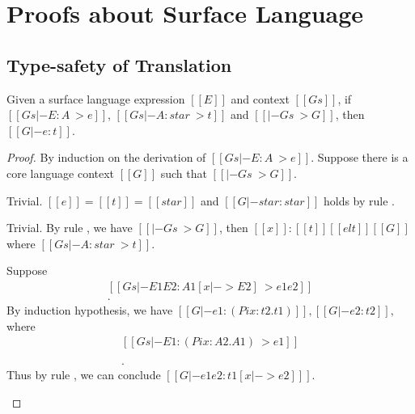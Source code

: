 \section{Proofs about Surface Language}
\subsection{Type-safety of Translation}

\begin{thm}
Given a surface language expression $[[E]]$ and context $[[Gs]]$, 
if $[[Gs |- E:A ~> e]]$, $[[Gs |- A:star ~> t]]$ and $[[|- Gs ~> G]]$, then
$[[G |- e:t]]$.
\end{thm}

\begin{proof}
    By induction on the derivation of $[[Gs |- E : A ~> e]]$. Suppose there is
a core language context $[[G]]$ such that $[[|- Gs ~> G]]$.
    \begin{description}
        \renewcommand{\hlmath}[1]{#1}
        \item[Case $\ottdruleTRXXAx{}$:] $\quad$ \\ Trivial. $[[e]] = [[t]] = [[star]]$ and
$[[G |- star:star]]$ holds by rule .
        \item[Case $\ottdruleTRXXVar{}$:] $\quad$ \\ Trivial. By rule , we
have $[[|- Gs ~> G]]$, then $[[x]]:[[t]] [[elt]] [[G]]$ where $[[Gs |-
A:star~>t]]$.
        \item[Case \resizebox{.9\columnwidth}{!}{$\ottdruleTRXXApp{}$}:] $\quad$ \\ Suppose
            \[\begin{array}{l}
            [[Gs |- E1 E2 : A1[x |-> E2] ~> e1 e2]] \\
            [[Gs |- A1[x |-> E2] : star ~> t1 [x |-> e2] ]].
            \end{array} \]
            By induction
            hypothesis, we have 
            $
            [[G |- e1 : (Pi x:t2.t1)]],
            [[G |- e2:t2]],
            $
            where
            \[\begin{array}{l}
             [[Gs |- E1 : (Pi x:A2.A1) ~> e1]] \\
              [[Gs |- (Pi x:A2.A1) : star ~> (Pi x:t2.t1)]] \\
              [[Gs |- E2 : A2 ~> e2]] \\
              [[Gs |- A2 : star ~> t2]].
            \end{array}\] Thus by rule , we can conclude $[[G |- e1 e2 : t1 [x |-> e2] ]]$.

\end{description}
\end{proof}
